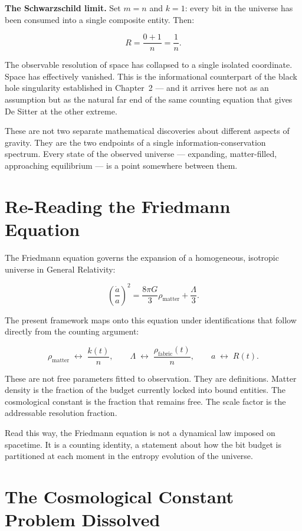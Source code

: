 \textbf{The Schwarzschild limit.} Set $m = n$ and $k = 1$: every bit in
the universe has been consumed into a single composite entity. Then:

\[
R = \frac{0 + 1}{n} = \frac{1}{n}.
\]

The observable resolution of space has collapsed to a single isolated
coordinate. Space has effectively vanished. This is the informational
counterpart of the black hole singularity established in Chapter~2 ---
and it arrives here not as an assumption but as the natural far end of
the same counting equation that gives De Sitter at the other extreme.

These are not two separate mathematical discoveries about different
aspects of gravity. They are the two endpoints of a single
information-conservation spectrum. Every state of the observed universe
--- expanding, matter-filled, approaching equilibrium --- is a point
somewhere between them.

\section{Re-Reading the Friedmann Equation}

The Friedmann equation governs the expansion of a homogeneous, isotropic
universe in General Relativity:

\[
\left(\frac{\dot{a}}{a}\right)^2 = \frac{8\pi G}{3}\rho_{\mathrm{matter}}
+ \frac{\Lambda}{3}.
\]

The present framework maps onto this equation under identifications that
follow directly from the counting argument:

\[
\rho_{\mathrm{matter}} \;\longleftrightarrow\; \frac{k(t)}{n},
\qquad
\Lambda \;\longleftrightarrow\; \frac{\rho_{\mathrm{fabric}}(t)}{n},
\qquad
a \;\longleftrightarrow\; R(t).
\]

These are not free parameters fitted to observation. They are
definitions. Matter density is the fraction of the budget currently
locked into bound entities. The cosmological constant is the fraction
that remains free. The scale factor is the addressable resolution
fraction.

Read this way, the Friedmann equation is not a dynamical law imposed on
spacetime. It is a counting identity, a statement about how the bit
budget is partitioned at each moment in the entropy evolution of the
universe.

\section{The Cosmological Constant Problem Dissolved}

